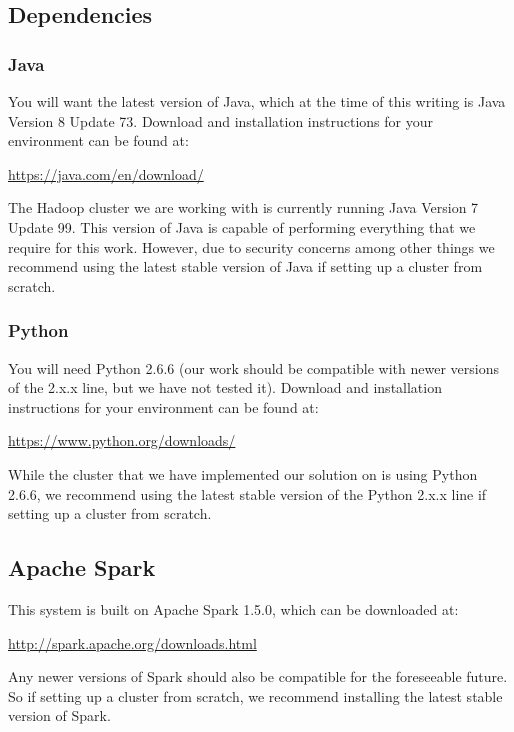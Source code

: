 
\subsection{Dependencies}

\subsubsection{Java}
You will want the latest version of Java, which at the time of this writing is Java Version 8 Update 73. Download and installation instructions for your environment can be found at:

\href{https://java.com/en/download/}{https://java.com/en/download/}

The Hadoop cluster we are working with is currently running Java Version 7 Update 99. This version of Java is capable of performing everything that we require for this work. However, due to security concerns among other things we recommend using the latest stable version of Java if setting up a cluster from scratch.

\subsubsection{Python}
You will need Python 2.6.6 (our work should be compatible with newer versions of the 2.x.x line, but we have not tested it). Download and installation instructions for your environment can be found at:

\href{https://www.python.org/downloads/}{https://www.python.org/downloads/}

While the cluster that we have implemented our solution on is using Python 2.6.6, we recommend using the latest stable version of the Python 2.x.x line if setting up a cluster from scratch.

\subsection{Apache Spark}
This system is built on Apache Spark 1.5.0, which can be downloaded at:

\href{http://spark.apache.org/downloads.html}{http://spark.apache.org/downloads.html}

Any newer versions of Spark should also be compatible for the foreseeable future. So if setting up a cluster from scratch, we recommend installing the latest stable version of Spark.

